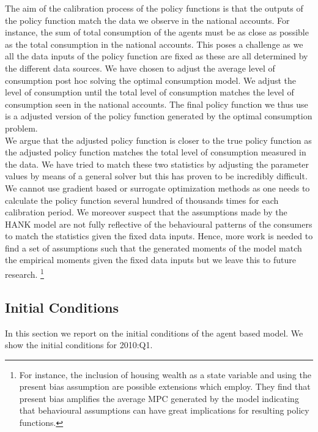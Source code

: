 \noindent The aim of the calibration process of the policy functions is that the outputs of the policy function match the data we observe in the national accounts. For instance, the sum of total consumption of the agents must be as close as possible as the total consumption in the national accounts. This poses a challenge as we all the data inputs of the policy function are fixed as these are all determined by the different data sources. We have chosen to adjust the average level of consumption post hoc solving the optimal consumption model. We adjust the level of consumption until the total level of consumption matches the level of consumption seen in the national accounts. The final policy function we thus use is a adjusted version of the policy function generated by the optimal consumption problem.\\

\noindent We argue that the adjusted policy function is closer to the true policy function as the adjusted policy function matches the total level of consumption measured in the data. We have tried to match these two statistics by adjusting the parameter values by means of a general solver but this has proven to be incredibly difficult. We cannot use gradient based or surrogate optimization methods as one needs to calculate the policy function several hundred of thousands times for each calibration period. We moreover suspect that the assumptions made by the HANK model are not fully reflective of the behavioural patterns of the consumers to match the statistics given the fixed data inputs. Hence, more work is needed to find a set of assumptions such that the generated moments of the model match the empirical moments given the fixed data inputs but we leave this to future research. \footnote{For instance, the inclusion of housing wealth as a state variable and using the present bias assumption are possible extensions which \cite{laibson_present_nodate} employ. They find that present bias amplifies the average MPC generated by the model indicating that behavioural assumptions can have great implications for resulting policy functions.}

\subsection{Initial Conditions}

In this section we report on the initial conditions of the agent based model. We show the initial conditions for 2010:Q1. 

